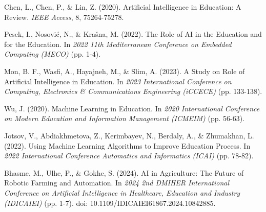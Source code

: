 \documentclass[conference]{IEEEtran}
\begin{document}
\begin{thebibliography}{99}

Chen, L., Chen, P., \& Lin, Z. (2020). Artificial Intelligence in Education: A Review. \textit{IEEE Access}, 8, 75264-75278.

Pesek, I., Nosović, N., \& Krašna, M. (2022). The Role of AI in the Education and for the Education. In \textit{2022 11th Mediterranean Conference on Embedded Computing (MECO)} (pp. 1-4).

Mon, B. F., Wasfi, A., Hayajneh, M., \& Slim, A. (2023). A Study on Role of Artificial Intelligence in Education. In \textit{2023 International Conference on Computing, Electronics \& Communications Engineering (iCCECE)} (pp. 133-138).

Wu, J. (2020). Machine Learning in Education. In \textit{2020 International Conference on Modern Education and Information Management (ICMEIM)} (pp. 56-63).

Jotsov, V., Abdiakhmetova, Z., Kerimbayev, N., Berdaly, A., \& Zhumakhan, L. (2022). Using Machine Learning Algorithms to Improve Education Process. In \textit{2022 International Conference Automatics and Informatics (ICAI)} (pp. 78-82).

Bhasme, M., Ulhe, P., \& Gokhe, S. (2024). AI in Agriculture: The Future of Robotic Farming and Automation. In \textit{2024 2nd DMIHER International Conference on Artificial Intelligence in Healthcare, Education and Industry (IDICAIEI)} (pp. 1-7). doi: 10.1109/IDICAIEI61867.2024.10842885.

\end{thebibliography}
\end{document}
